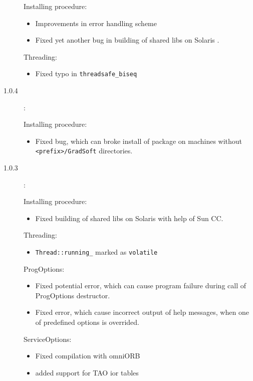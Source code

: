 \documentclass[10pt]{article}
\newenvironment{component}[1]{\par#1:\begin{itemize}}{\end{itemize}}
\begin{document}
\begin{description}
       \begin{component}{Installing procedure}
         \item Improvements in error handling scheme
         \item Fixed yet another bug in building of shared libs on Solaris .
       \end{component}

       \begin{component}{Threading}
         \item Fixed typo in \verb|threadsafe_biseq|
       \end{component}

 \item [1.0.4]:

       \begin{component}{Installing procedure}
         \item Fixed bug, which can broke install of package on machines without
              \verb|<prefix>/GradSoft| directories.
       \end{component}

 \item [1.0.3]:

       \begin{component}{Installing procedure}
         \item Fixed building of shared libs on Solaris with help of Sun CC.
       \end{component}

       \begin{component}{Threading}
           \item \verb|Thread::running_| marked as \verb|volatile|
       \end{component}

       \begin{component}{ProgOptions}
           \item Fixed potential error, which can cause program failure during call of ProgOptions destructor. 
           \item Fixed error, which cause incorrect output of help messages, when one of predefined options is overrided.
       \end{component}

       \begin{component}{ServiceOptions}
           \item Fixed compilation with omniORB
           \item added support for TAO ior tables
       \end{component}

\end{description}
\end{document}
